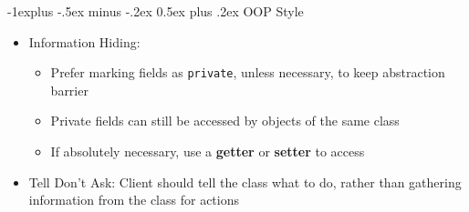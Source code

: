 \documentclass[10pt, landscape]{article}
\makeatletter
\renewcommand{\section}{\@startsection{section}{1}{0mm}%
                                {-1ex plus -.5ex minus -.2ex}%
                                {0.5ex plus .2ex}%
                                {\normalfont\large\bfseries}}
\renewcommand{\section}{\@startsection{section}{2}{0mm}%
                                {-1explus -.5ex minus -.2ex}%
                                {0.5ex plus .2ex}%
                                {\normalfont\normalsize\bfseries}}
\makeatother
\begin{document}
\begin{multicols*}{4}
\section{OOP Style}
\begin{itemize}
    \item Information Hiding:
    \begin{itemize}
        \item Prefer marking fields as \lstinline{private}, unless necessary, to keep abstraction barrier
        \item Private fields can still be accessed by objects of the same class
        \item If absolutely necessary, use a \textbf{getter} or \textbf{setter} to access
    \end{itemize}
    \item Tell Don't Ask: Client should tell the class what to do, rather than gathering information from the class for actions
\end{itemize}


\end{multicols*}
\end{document}
